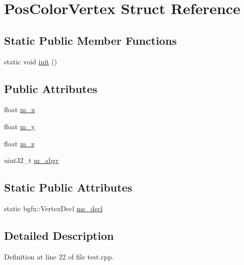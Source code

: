 \hypertarget{struct_pos_color_vertex}{\section{Pos\+Color\+Vertex Struct Reference}
\label{struct_pos_color_vertex}
}
\subsection*{Static Public Member Functions}
\begin{DoxyCompactItemize}
\item 
static void \hyperlink{struct_pos_color_vertex_a9fc46aef1b395cba70a485a029f10699}{init} ()
\end{DoxyCompactItemize}
\subsection*{Public Attributes}
\begin{DoxyCompactItemize}
\item 
float \hyperlink{struct_pos_color_vertex_ae76dd65e99bcbd4fd79ec0e2c3d0e7af}{m\+\_\+x}
\item 
float \hyperlink{struct_pos_color_vertex_ad7267f34b67c4df4d93f36cfa155ad30}{m\+\_\+y}
\item 
float \hyperlink{struct_pos_color_vertex_ad1c60f507ba3000e2462ac991239bfa9}{m\+\_\+z}
\item 
uint32\+\_\+t \hyperlink{struct_pos_color_vertex_a25470b2d054e5487d952621d4d56df71}{m\+\_\+abgr}
\end{DoxyCompactItemize}
\subsection*{Static Public Attributes}
\begin{DoxyCompactItemize}
\item 
static bgfx\+::\+Vertex\+Decl \hyperlink{struct_pos_color_vertex_aa549173ded56d04849504690c104a28e}{ms\+\_\+decl}
\end{DoxyCompactItemize}


\subsection{Detailed Description}


Definition at line 22 of file test.\+cpp.



